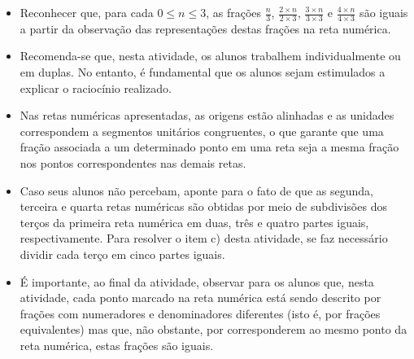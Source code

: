 \pagebreak


\begin{objetivos}[label=chap4-ativ7]{}{}
\begin{itemize} %
    \item       Reconhecer que, para cada       $0 \leq n \leq 3$, as frações
   $\frac{n}{3}$,       $\frac{2 \times n}{2 \times 3 }$,       $\frac{3 \times
n}{3 \times 3}$       e       $\frac{4 \times n}{4 \times 3}$       são iguais a
partir da observação das representações destas frações na reta numérica.
\end{itemize} %
\end{objetivos}

\begin{orientacoes}{}{}

\begin{itemize} %
    \item       Recomenda-se que, nesta atividade, os alunos trabalhem
individualmente ou em duplas. No entanto, é fundamental que os alunos sejam
estimulados a explicar o raciocínio realizado.
    \item       Nas retas numéricas apresentadas, as origens estão alinhadas e
as unidades correspondem a segmentos unitários congruentes, o que garante que
uma fração associada a um determinado ponto em uma reta seja a mesma fração nos
pontos correspondentes nas demais retas.
    \item       Caso seus alunos não percebam, aponte para o fato de que as
segunda, terceira e quarta retas numéricas são obtidas por meio de subdivisões
dos terços da primeira reta numérica em duas, três e quatro partes iguais,
respectivamente. Para resolver o item c) desta atividade, se faz necessário
dividir cada terço em cinco partes iguais.
    \item       É importante, ao final da atividade, observar para os alunos
que, nesta atividade, cada ponto marcado na reta numérica está sendo descrito
por frações com numeradores e denominadores diferentes (isto é, por frações
equivalentes) mas que, não obstante, por corresponderem ao mesmo ponto da reta
numérica, estas frações são iguais.
\end{itemize} %







\end{orientacoes}
